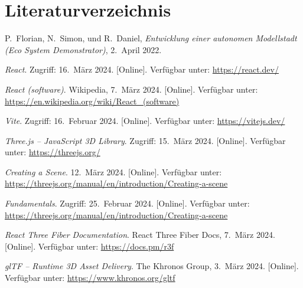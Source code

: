 \section{Literaturverzeichnis}

\begin{thebibliography}{9}

P.~Florian, N.~Simon, und R.~Daniel, 
\emph{Entwicklung einer autonomen Modellstadt (Eco System Demonstrator)},
2.~April 2022.

\emph{React}. 
Zugriff: 16.~März 2024. [Online]. 
Verfügbar unter: \url{https://react.dev/}

\emph{React (software)}. 
Wikipedia, 7.~März 2024. [Online]. 
Verfügbar unter: \url{https://en.wikipedia.org/wiki/React_(software)}

\emph{Vite}. 
Zugriff: 16.~Februar 2024. [Online]. 
Verfügbar unter: \url{https://vitejs.dev/}

\emph{Three.js – JavaScript 3D Library}. 
Zugriff: 15.~März 2024. [Online]. 
Verfügbar unter: \url{https://threejs.org/}

\emph{Creating a Scene}. 
12.~März 2024. [Online]. 
Verfügbar unter: \url{https://threejs.org/manual/en/introduction/Creating-a-scene}

\emph{Fundamentals}. 
Zugriff: 25.~Februar 2024. [Online]. 
Verfügbar unter: \url{https://threejs.org/manual/en/introduction/Creating-a-scene}

\emph{React Three Fiber Documentation}. 
React Three Fiber Docs, 7.~März 2024. [Online]. 
Verfügbar unter: \url{https://docs.pm/r3f}

\emph{glTF – Runtime 3D Asset Delivery}. 
The Khronos Group, 3.~März 2024. [Online]. 
Verfügbar unter: \url{https://www.khronos.org/gltf}

\end{thebibliography}